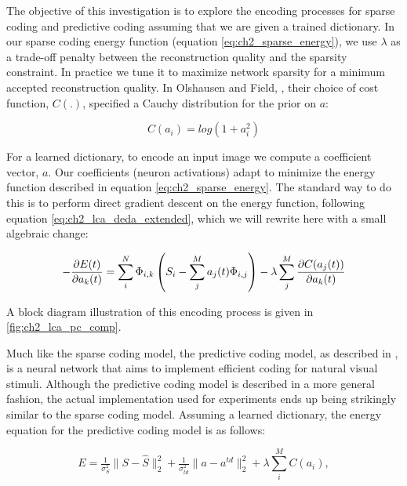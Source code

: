 The objective of this investigation is to explore the encoding processes for sparse coding and predictive coding assuming that we are given a trained dictionary. In our sparse coding energy function (equation \eqref{eq:ch2_sparse_energy}), we use $\lambda$ as a trade-off penalty between the reconstruction quality and the sparsity constraint. In practice we tune it to maximize network sparsity for a minimum accepted reconstruction quality. In Olshausen and Field, \citeyearpar{olshausen1997sparse}, their choice of cost function, $C(.)$, specified a Cauchy distribution for the prior on $a$:

\begin{equation}\label{eq:ch2_cauchy_cost}
  C(a_{i}) = log(1+a_{i}^{2})
\end{equation}

For a learned dictionary, to encode an input image we compute a coefficient vector, $a$. Our coefficients (neuron activations) adapt to minimize the energy function described in equation \eqref{eq:ch2_sparse_energy}. The standard way to do this is to perform direct gradient descent on the energy function, following equation \eqref{eq:ch2_lca_deda_extended}, which we will rewrite here with a small algebraic change:

\begin{equation}\label{eq:ch2_sc_deda_rewrite}
    - \frac{\partial E(t)}{\partial a_{k}(t)}
    =
        \sum\limits_{i}^{N} \Phi_{i,k} \left(S_{i} - \sum\limits_{j}^{M}a_{j}(t) \Phi_{i,j}\right) -
        \lambda \sum\limits_{j}^{M}\frac{\partial C(a_{j}(t))}{\partial a_{k}(t)} \\
\end{equation}

A block diagram illustration of this encoding process is given in \ref{fig:ch2_lca_pc_comp}.

Much like the sparse coding model, the predictive coding model, as described in \parencite{rao1997dynamic, rao1999predictive}, is a neural network that aims to implement efficient coding for natural visual stimuli. Although the predictive coding model is described in a more general fashion, the actual implementation used for experiments ends up being strikingly similar to the sparse coding model. Assuming a learned dictionary, the energy equation for the predictive coding model is as follows:

\begin{equation}\label{eq:ch2_pc_energy_func}
        E =
        \tfrac{1}{\sigma_{S}^{2}} \|S - \hat{S} \|_{2}^{2} +
        \tfrac{1}{\sigma_{td}^{2}} \|a - a^{td}\|_{2}^{2} +
        \lambda \sum\limits_{i}^{M}C(a_{i}),
\end{equation}

